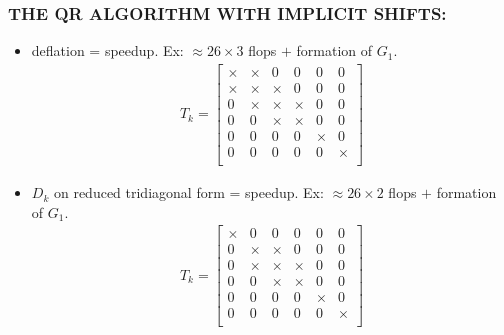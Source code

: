 \documentclass[a4paper,8pt]{beamer} %
\newcommand{\smatrix}[1]{\left[\begin{matrix} #1 \end{matrix}\right]}
\begin{document}
\begin{frame} %
\frametitle{THE QR ALGORITHM WITH IMPLICIT SHIFTS:} 
\begin{itemize}
	\item deflation = speedup. Ex: $\approx 26 \times 3$ flops $+$ formation of $G_1$.
		\begin{align}
			T_k = \smatrix{
				\times & \times & 		0 	& 0 & 0 & 0 \\
				\times & \times & \times 	& 0 & 0 & 0 \\
				0 & \times & \times	& \times 	& 0 & 0 \\
				0 &  0 & \times	& \times 		& 0 & 0 \\
				0 &  0 & 0	& 0 	& \times & 0 \\
				0 &  0 & 0	& 0 	& 0 & \times \\
			}
		\end{align}
	\item $D_k$ on reduced tridiagonal form = speedup. Ex: $\approx 26\times2$ flops $+$ formation of $G_1$.
		\begin{align}
			T_k = \smatrix{
				\times & 0 & 		0 	& 0 & 0 & 0 \\
				0 & \times & \times 	& 0 & 0 & 0 \\
				0 & \times & \times	& \times 	& 0 & 0 \\
				0 &  0 & \times	& \times 		& 0 & 0 \\
				0 &  0 & 0	& 0 	& \times & 0 \\
				0 &  0 & 0	& 0 	& 0 & \times \\
			}
		\end{align}
\end{itemize}
\end{frame}%
\end{document}
